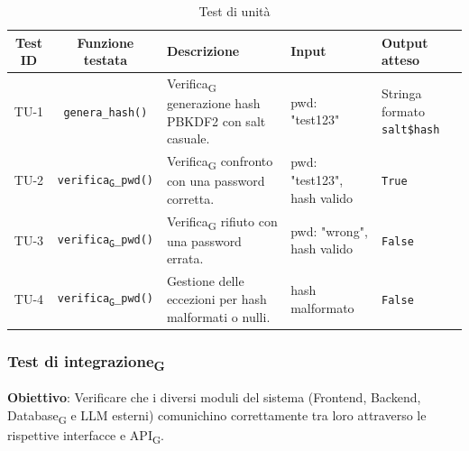 \documentclass[11pt,a4paper]{article}
\newcommand{\gls}[1]{#1\textsubscript{G}}
\begin{document}
\begin{table}[H]
    \centering
    \small %
    \begin{tabularx}{\textwidth}{|c|c|X|p{2.5cm}|p{2.5cm}|}
        \hline
        \textbf{Test ID} & \textbf{Funzione testata} & \textbf{Descrizione} & \textbf{Input} & \textbf{Output atteso} \\
        \hline
        TU-1 & \texttt{genera\_hash()} & \gls{Verifica} generazione hash PBKDF2 con salt casuale. & pwd: "test123" & Stringa formato \texttt{salt\$hash} \\
        \hline
        TU-2 & \texttt{\gls{verifica}\_pwd()} & \gls{Verifica} confronto con una password corretta. & pwd: "test123", hash valido & \texttt{True} \\
        \hline
        TU-3 & \texttt{\gls{verifica}\_pwd()} & \gls{Verifica} rifiuto con una password errata. & pwd: "wrong", hash valido & \texttt{False} \\
        \hline
        TU-4 & \texttt{\gls{verifica}\_pwd()} & Gestione delle eccezioni per hash malformati o nulli. & hash malformato & \texttt{False} \\
        \hline
    \end{tabularx}
    \caption{Test di unità}
\end{table}

\subsubsection{\gls{Test di integrazione}}
\textbf{Obiettivo}: Verificare che i diversi moduli del sistema (Frontend, Backend, \gls{Database} e LLM esterni) comunichino correttamente tra loro attraverso le rispettive interfacce e \gls{API}.
\end{document}
